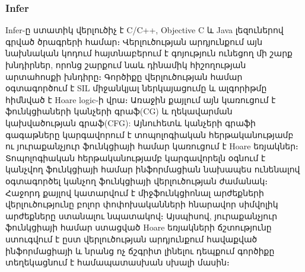 \subsubsection{Infer}
Infer\cite{Infer}-ը ստատիկ վերլուծիչ է C/C++, Objective C և Java լեզուներով գրված ծրագրերի համար։ Վերլուծության
արդյունքում այն նախնական կոդում հայտնաբերում է գոյություն ունեցող մի շարք խնդիրներ, որոնց շարքում նաև դինամիկ հիշողության
արտահոսքի խնդիրը։ Գործիքը վերլուծության համար օգտագործում է SIL\cite{SIL} միջանկյալ ներկայացումը և ալգորիթմը հիմնված է
Hoare logic\cite{Hoare1969}-ի վրա։ Առաջին քայլում այն կառուցում է ֆունկցիաների կանչերի գրաֆ(CG) և ղեկավարման
կախվածության գրաֆ(CFG): Այնուհետև կանչերի գրաֆի գագաթները կարգավորում է տոպոլոգիական հերթականությամբ ու յուրաքանչյուր
ֆունկցիայի համար կառուցում է Hoare եռյակներ։ Տոպոլոգիական հերթականությամբ կարգավորելն օգնում է կանչվող ֆունկցիայի
համար ինֆորմացիան նախապես ունենալով օգտագործել կանչող ֆունկցիայի վերլուծության ժամանակ։ Հաջորդ քայլով կատարվում է
միջֆունկցիոնալ արժեքների վերլուծությունը\cite{Reps1995} բոլոր փոփոխականների հնարավոր սիմվոլիկ արժեքները ստանալու նպատակով։
Այսպիսով, յուրաքանչյուր ֆունկցիայի համար ստացված Hoare եռյակների ճշտությունը ստուգվում է ըստ վերլուծության արդյունքում
հավաքված ինֆորմացիայի և նրանց ոչ ճշգրիտ լինելու դեպքում գործիքը տեղեկացնում է համապատասխան սխալի մասին։